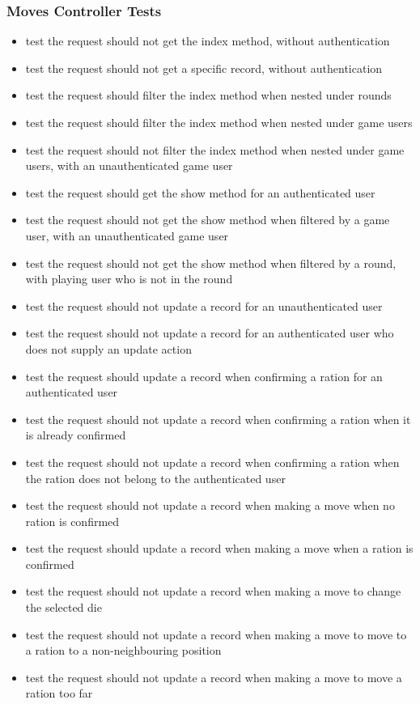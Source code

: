 \subsubsection{Moves Controller Tests}
\begin{itemize}
	\item test the request should not get the index method, without authentication
	\item test the request should not get a specific record, without authentication
	\item test the request should filter the index method when nested under rounds
	\item test the request should filter the index method when nested under game users
	\item test the request should not filter the index method when nested under game users, with an unauthenticated game user
	\item test the request should get the show method for an authenticated user
	\item test the request should not get the show method when filtered by a game user, with an unauthenticated game user
	\item test the request should not get the show method when filtered by a round, with playing user who is not in the round
	\item test the request should not update a record for an unauthenticated user
	\item test the request should not update a record for an authenticated user who does not supply an update action
	\item test the request should update a record when confirming a ration for an authenticated user
	\item test the request should not update a record when confirming a ration when it is already confirmed
	\item test the request should not update a record when confirming a ration when the ration does not belong to the authenticated user
	\item test the request should not update a record when making a move when no ration is confirmed
	\item test the request should update a record when making a move when a ration is confirmed
	\item test the request should not update a record when making a move to change the selected die
	\item test the request should not update a record when making a move to move to a ration to a non-neighbouring position
	\item test the request should not update a record when making a move to move a ration too far
\end{itemize}

